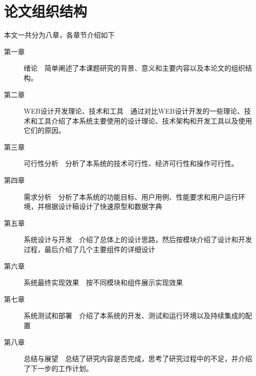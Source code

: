 \section{论文组织结构}
本文一共分为八章，各章节介绍如下
\begin{description}
    \item[第一章] 绪论~~简单阐述了本课题研究的背景、意义和主要内容以及本论文的组织结构。
    \item[第二章] WEB设计开发理论、技术和工具~~通过对比WEB设计开发的一些理论、技术和工具介绍了本系统主要使用的设计理论、技术架构和开发工具以及使用它们的原因。
    \item[第三章] 可行性分析~~分析了本系统的技术可行性、经济可行性和操作可行性。
    \item[第四章] 需求分析~~分析了本系统的功能目标、用户用例、性能要求和用户运行环境，并根据设计稿设计了快速原型和数据字典
    \item[第五章] 系统设计与开发~~介绍了总体上的设计思路，然后按模块介绍了设计和开发过程，最后介绍了几个主要组件的详细设计
    \item[第六章] 系统最终实现效果~~按不同模块和组件展示实现效果
    \item[第七章] 系统测试和部署~~介绍了本系统的开发、测试和运行环境以及持续集成的配置
    \item[第八章] 总结与展望~~总结了研究内容是否完成，思考了研究过程中的不足，并介绍了下一步的工作计划。
\end{description}

